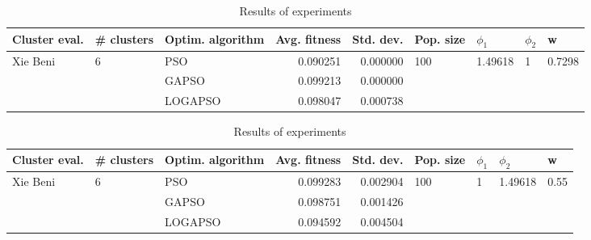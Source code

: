 \documentclass{article}
\begin{document}
\begin{table}
\centering
\caption{Results of experiments}
\begin{tabular}{lllrrllll}
\toprule
            Cluster eval. &        \# clusters & Optim. algorithm &  Avg. fitness &  Std. dev. &            Pop. size &               $\phi_{1}$ &         $\phi_{2}$ &                       w \\
\midrule
\multirow{3}{*}{Xie Beni} & \multirow{3}{*}{6} &              PSO &      0.090251 &   0.000000 & \multirow{3}{*}{100} & \multirow{3}{*}{1.49618} & \multirow{3}{*}{1} & \multirow{3}{*}{0.7298} \\
                          &                    &            GAPSO &      0.099213 &   0.000000 &                      &                          &                    &                         \\
                          &                    &          LOGAPSO &      0.098047 &   0.000738 &                      &                          &                    &                         \\
\bottomrule
\end{tabular}
\end{table}
\begin{table}
\centering
\caption{Results of experiments}
\begin{tabular}{lllrrllll}
\toprule
            Cluster eval. &        \# clusters & Optim. algorithm &  Avg. fitness &  Std. dev. &            Pop. size &         $\phi_{1}$ &               $\phi_{2}$ &                     w \\
\midrule
\multirow{3}{*}{Xie Beni} & \multirow{3}{*}{6} &              PSO &      0.099283 &   0.002904 & \multirow{3}{*}{100} & \multirow{3}{*}{1} & \multirow{3}{*}{1.49618} & \multirow{3}{*}{0.55} \\
                          &                    &            GAPSO &      0.098751 &   0.001426 &                      &                    &                          &                       \\
                          &                    &          LOGAPSO &      0.094592 &   0.004504 &                      &                    &                          &                       \\
\bottomrule
\end{tabular}
\end{table}
\end{document}
